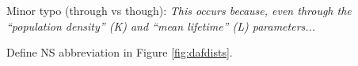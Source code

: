 
\begin{point}{}
    Minor typo (through vs though): \emph{This occurs because, even through the ``population density'' (K) and ``mean lifetime'' (L) parameters...}
\end{point}


\begin{point}{}
    Define NS abbreviation in Figure \ref{fig:dafdists}.
\end{point}


